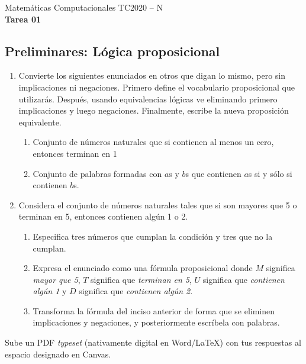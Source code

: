 \documentclass[]{book}
\theoremstyle{definition}
\begin{document}
\begin{center}
{\huge Matemáticas Computacionales TC2020 -- N}\\[1.5ex]
{\large \textbf{Tarea 01}\\[1.5ex] %
} %
\end{center}

\vspace{0.2 cm}

\subsection*{Preliminares: Lógica proposicional}

\begin{enumerate}
	\itemsep0.35in

	\item Convierte los siguientes enunciados en otros que digan lo mismo, pero sin implicaciones ni negaciones.
	Primero define el vocabulario proposicional que utilizarás. Después, usando equivalencias lógicas ve eliminando primero implicaciones y luego negaciones.
	Finalmente, escribe la nueva proposición equivalente.
	\begin{enumerate}
		\item Conjunto de números naturales que si contienen al menos un cero, entonces terminan en 1
		\item Conjunto de palabras formadas con $a$s y $b$s que contienen $a$s si y sólo si contienen $b$s.
	\end{enumerate}
	\item Considera el conjunto de números naturales tales que si son mayores que 5 o terminan en 5, entonces contienen algún 1 o 2.
	\begin{enumerate}
		\item Especifica tres números que cumplan la condición y tres que no la cumplan.
		\item Expresa el enunciado como una fórmula proposicional donde $M$ significa \textit{mayor que 5}, $T$ significa que \textit{terminan en 5}, $U$ significa que \textit{contienen algún 1} y $D$ significa que \textit{contienen algún 2}.
		\item Transforma la fórmula del inciso anterior de forma que se eliminen implicaciones y negaciones, y posteriormente escríbela con palabras.
	\end{enumerate}
    \end{enumerate}
    
    \vspace{0.5in}
    \noindent Sube un PDF \textit{typeset} (nativamente digital en Word/\LaTeX) con tus respuestas al espacio designado en Canvas.
\end{document}

